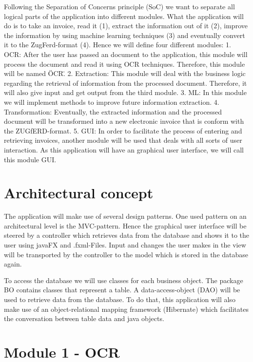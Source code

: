 Following the Separation of Concerns principle (SoC) we want to separate all logical parts of the application into different modules.
What the application will do is to take an invoice, read it (1), extract the information out of it (2), improve the information by using machine learning techniques (3) and eventually convert it to the ZugFerd-format (4).
Hence we will define four different modules:
1. OCR: After the user has passed an document to the application, this module will process the document and read it using OCR techniques. Therefore, this module will be named \"OCR\".
2. Extraction: This module will deal with the business logic regarding the retrieval of information from the processed document. Therefore, it will also give input and get output from the third module.
3. ML: In this module we will implement methods to improve future information extraction.
4. Transformation: Eventually, the extracted information and the processed document will be transformed into a new electronic invoice that is conform with the ZUGfERD-format.
5. GUI: In order to facilitate the process of entering and retrieving invoices, another module will be used that deals with all sorts of user interaction. As this application will have an graphical user interface, we will call this module GUI.

\section{Architectural concept}

The application will make use of several design patterns. One used pattern on an architectural level is the MVC-pattern. Hence the graphical user interface will be steered by a controller which retrieves data from the database and shows it to the user using javaFX and .fxml-Files. Input and changes the user makes in the view will be transported by the controller to the model which is stored in the database again.

To access the database we will use classes for each business object. The package BO contains classes that represent a table. A data-access-object (DAO) will be used to retrieve data from the database. To do that, this application will also make use of an object-relational mapping framework (Hibernate) which facilitates the conversation between table data and java objects.

\section{Module 1 - OCR}


